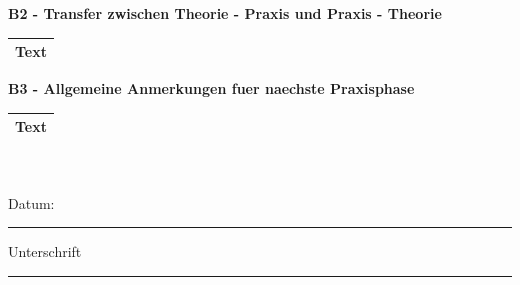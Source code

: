 	\textbf{B2 - Transfer zwischen Theorie - Praxis und Praxis - Theorie} \\
	\begin{tabular}{|p{14cm}|}
		\hline
		Text\\
		\hline
	\end{tabular}

	\textbf{B3 - Allgemeine Anmerkungen fuer naechste Praxisphase} \\
	\begin{tabular}{|p{14cm}|}
		\hline
		 Text\\
		\hline
	\end{tabular}\\
\vspace{1cm}\\
Datum: \rule{4cm}{0.4pt}\hspace*{5mm} Unterschrift \rule{4cm}{0.4pt}\\